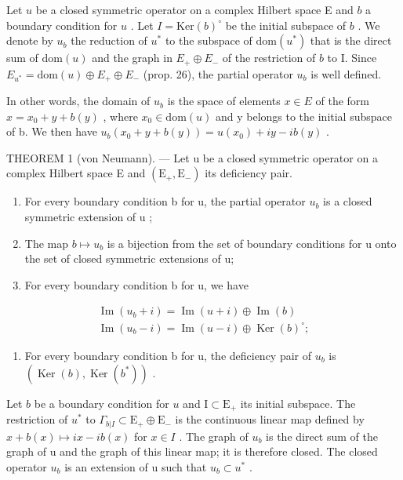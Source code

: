 Let \(u\) be a closed symmetric operator on a complex Hilbert space E and \(b\) a boundary condition for \(u\) . Let \(I = \text{Ker}(b)^{\circ}\) be the initial subspace of \(b\) . We denote by \(u_b\) the reduction of \(u^*\) to the subspace of \(\text{dom}(u^*)\) that is the direct sum of \(\text{dom}(u)\) and the graph in \(E_+ \oplus E_-\) of the restriction of \(b\) to I. Since \(E_{u^*} = \text{dom}(u) \oplus E_+ \oplus E_-\) (prop. 26), the partial operator \(u_b\) is well defined.

In other words, the domain of \(u_{b}\) is the space of elements \(x \in E\) of the form \(x = x_{0} + y + b(y)\) , where \(x_{0} \in \text{dom}(u)\) and y belongs to the initial subspace of b. We then have \(u_{b}(x_{0} + y + b(y)) = u(x_{0}) + iy - ib(y)\) .

THEOREM 1 (von Neumann). --- Let u be a closed symmetric operator on a complex Hilbert space E and \((\mathrm{E}_{+}, \mathrm{E}_{-})\) its deficiency pair.

\begin{enumerate}
\def\labelenumi{\alph{enumi})}
\item
  For every boundary condition b for u, the partial operator \(u_{b}\) is a closed symmetric extension of u ;
\item
  The map \(b \mapsto u_{b}\) is a bijection from the set of boundary conditions for u onto the set of closed symmetric extensions of u;
\item
  For every boundary condition b for u, we have
\end{enumerate}

\[
\begin{array}{l} \operatorname{Im} (u _ {b} + i) = \operatorname{Im} (u + i) \oplus \operatorname{Im} (b) \\ \operatorname{Im} (u _ {b} - i) = \operatorname{Im} (u - i) \oplus \operatorname{Ker} (b) ^ {\circ}; \end{array}
\]

\begin{enumerate}
\def\labelenumi{\alph{enumi})}
\setcounter{enumi}{3}
\tightlist
\item
  For every boundary condition b for u, the deficiency pair of \(u_{b}\) is \((\operatorname{Ker}(b), \operatorname{Ker}(b^{*}))\) .
\end{enumerate}

Let \(b\) be a boundary condition for \(u\) and \(\mathrm{I} \subset \mathrm{E}_{+}\) its initial subspace. The restriction of \(u^{*}\) to \(\Gamma_{b|I} \subset \mathrm{E}_{+} \oplus \mathrm{E}_{-}\) is the continuous linear map defined by \(x + b(x) \mapsto ix - ib(x)\) for \(x \in I\) . The graph of \(u_{b}\) is the direct sum of the graph of u and the graph of this linear map; it is therefore closed. The closed operator \(u_{b}\) is an extension of u such that \(u_{b} \subset u^{*}\) .

